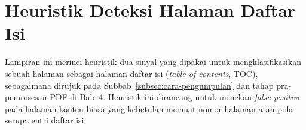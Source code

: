 \documentclass[main]{subfiles}
\begin{document}
\ifSubfilesClassLoaded{}{\appendix}

\chapter{Heuristik Deteksi Halaman Daftar Isi}
\label{lamp:heuristik-toc}

Lampiran ini merinci heuristik dua-sinyal yang dipakai untuk mengklasifikasikan
sebuah halaman sebagai halaman daftar isi (\textit{table of contents}, TOC),
sebagaimana dirujuk pada Subbab~\ref{subsec:cara-pengumpulan} dan tahap
pra-pemrosesan PDF di Bab~4. Heuristik ini dirancang untuk menekan
\textit{false positive} pada halaman konten biasa yang kebetulan memuat nomor
halaman atau pola serupa entri daftar isi.

\end{document}
